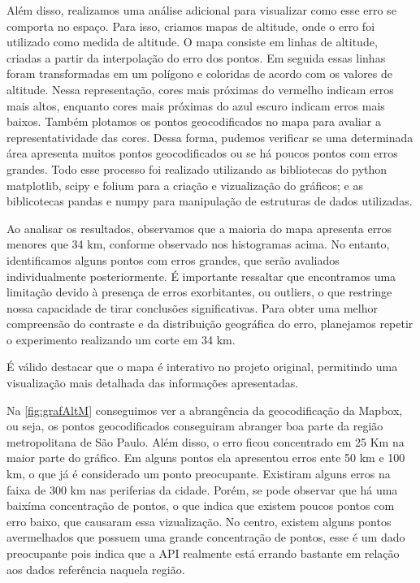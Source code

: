 Além disso, realizamos uma análise adicional para visualizar como esse erro se comporta no espaço. Para isso, criamos mapas de altitude, onde o erro foi utilizado como medida de altitude. O mapa consiste em linhas de altitude, criadas a partir da interpolação do erro dos pontos. Em seguida essas linhas foram transformadas em um polígono e coloridas de acordo com os valores de altitude. Nessa representação, cores mais próximas do vermelho indicam erros mais altos, enquanto cores mais próximas do azul escuro indicam erros mais baixos. Também plotamos os pontos geocodificados no mapa para avaliar a representatividade das cores. Dessa forma, pudemos verificar se uma determinada área apresenta muitos pontos geocodificados ou se há poucos pontos com erros grandes. Todo esse processo foi realizado utilizando as bibliotecas do python matplotlib, scipy e folium para a criação e vizualização do gráficos; e as biblicotecas pandas e numpy para manipulação de estruturas de dados utilizadas. 

Ao analisar os resultados, observamos que a maioria do mapa apresenta erros menores que 34 km, conforme observado nos histogramas acima. No entanto, identificamos alguns pontos com erros grandes, que serão avaliados individualmente posteriormente. É importante ressaltar que encontramos uma limitação devido à presença de erros exorbitantes, ou outliers, o que restringe nossa capacidade de tirar conclusões significativas. Para obter uma melhor compreensão do contraste e da distribuição geográfica do erro, planejamos repetir o experimento realizando um corte em 34 km.

É válido destacar que o mapa é interativo no projeto original, permitindo uma visualização mais detalhada das informações apresentadas.

Na \ref{fig:grafAltM} conseguimos ver a abrangência da geocodificação da Mapbox, ou seja, os pontos geocodificados conseguiram abranger boa parte da região metropolitana de São Paulo. Além disso, o erro ficou concentrado em 25 Km na maior parte do gráfico. Em alguns pontos ela apresentou erros ente 50 km e 100 km, o que já é considerado um ponto preocupante. Existiram alguns erros na faixa de 300 km nas periferias da cidade. Porém, se pode observar que há uma baixíma concentração de pontos, o que indica que existem poucos pontos com erro baixo, que causaram essa vizualização. No centro, existem alguns pontos avermelhados que possuem uma grande concentração de pontos, esse é um dado preocupante pois indica que a API realmente está errando bastante em relação aos dados referência naquela região.

